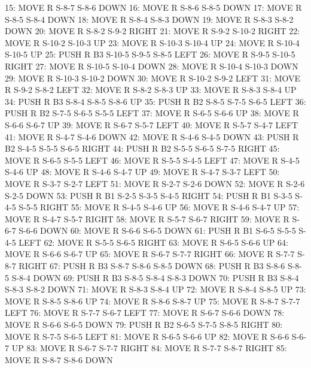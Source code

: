 \documentclass[12pt]{article}
\begin{document}
\begin{appendix}
\begin{itemize}
       15: MOVE R S-8-7 S-8-6 DOWN
       16: MOVE R S-8-6 S-8-5 DOWN
       17: MOVE R S-8-5 S-8-4 DOWN
       18: MOVE R S-8-4 S-8-3 DOWN
       19: MOVE R S-8-3 S-8-2 DOWN
       20: MOVE R S-8-2 S-9-2 RIGHT
       21: MOVE R S-9-2 S-10-2 RIGHT
       22: MOVE R S-10-2 S-10-3 UP
       23: MOVE R S-10-3 S-10-4 UP
       24: MOVE R S-10-4 S-10-5 UP
       25: PUSH R B3 S-10-5 S-9-5 S-8-5 LEFT
       26: MOVE R S-9-5 S-10-5 RIGHT
       27: MOVE R S-10-5 S-10-4 DOWN
       28: MOVE R S-10-4 S-10-3 DOWN
       29: MOVE R S-10-3 S-10-2 DOWN
       30: MOVE R S-10-2 S-9-2 LEFT
       31: MOVE R S-9-2 S-8-2 LEFT
       32: MOVE R S-8-2 S-8-3 UP
       33: MOVE R S-8-3 S-8-4 UP
       34: PUSH R B3 S-8-4 S-8-5 S-8-6 UP
       35: PUSH R B2 S-8-5 S-7-5 S-6-5 LEFT
       36: PUSH R B2 S-7-5 S-6-5 S-5-5 LEFT
       37: MOVE R S-6-5 S-6-6 UP
       38: MOVE R S-6-6 S-6-7 UP
       39: MOVE R S-6-7 S-5-7 LEFT
       40: MOVE R S-5-7 S-4-7 LEFT
       41: MOVE R S-4-7 S-4-6 DOWN
       42: MOVE R S-4-6 S-4-5 DOWN
       43: PUSH R B2 S-4-5 S-5-5 S-6-5 RIGHT
       44: PUSH R B2 S-5-5 S-6-5 S-7-5 RIGHT
       45: MOVE R S-6-5 S-5-5 LEFT
       46: MOVE R S-5-5 S-4-5 LEFT
       47: MOVE R S-4-5 S-4-6 UP
       48: MOVE R S-4-6 S-4-7 UP
       49: MOVE R S-4-7 S-3-7 LEFT
       50: MOVE R S-3-7 S-2-7 LEFT
       51: MOVE R S-2-7 S-2-6 DOWN
       52: MOVE R S-2-6 S-2-5 DOWN
       53: PUSH R B1 S-2-5 S-3-5 S-4-5 RIGHT
       54: PUSH R B1 S-3-5 S-4-5 S-5-5 RIGHT
       55: MOVE R S-4-5 S-4-6 UP
       56: MOVE R S-4-6 S-4-7 UP
       57: MOVE R S-4-7 S-5-7 RIGHT
       58: MOVE R S-5-7 S-6-7 RIGHT
       59: MOVE R S-6-7 S-6-6 DOWN
       60: MOVE R S-6-6 S-6-5 DOWN
       61: PUSH R B1 S-6-5 S-5-5 S-4-5 LEFT
       62: MOVE R S-5-5 S-6-5 RIGHT
       63: MOVE R S-6-5 S-6-6 UP
       64: MOVE R S-6-6 S-6-7 UP
       65: MOVE R S-6-7 S-7-7 RIGHT
       66: MOVE R S-7-7 S-8-7 RIGHT
       67: PUSH R B3 S-8-7 S-8-6 S-8-5 DOWN
       68: PUSH R B3 S-8-6 S-8-5 S-8-4 DOWN
       69: PUSH R B3 S-8-5 S-8-4 S-8-3 DOWN
       70: PUSH R B3 S-8-4 S-8-3 S-8-2 DOWN
       71: MOVE R S-8-3 S-8-4 UP
       72: MOVE R S-8-4 S-8-5 UP
       73: MOVE R S-8-5 S-8-6 UP
       74: MOVE R S-8-6 S-8-7 UP
       75: MOVE R S-8-7 S-7-7 LEFT
       76: MOVE R S-7-7 S-6-7 LEFT
       77: MOVE R S-6-7 S-6-6 DOWN
       78: MOVE R S-6-6 S-6-5 DOWN
       79: PUSH R B2 S-6-5 S-7-5 S-8-5 RIGHT
       80: MOVE R S-7-5 S-6-5 LEFT
       81: MOVE R S-6-5 S-6-6 UP
       82: MOVE R S-6-6 S-6-7 UP
       83: MOVE R S-6-7 S-7-7 RIGHT
       84: MOVE R S-7-7 S-8-7 RIGHT
       85: MOVE R S-8-7 S-8-6 DOWN

\end{itemize}
\end{appendix}
\end{document}
